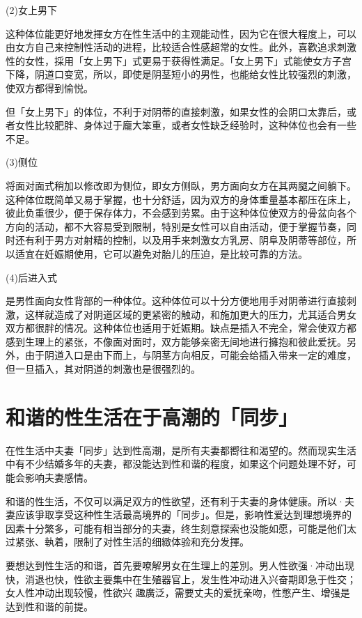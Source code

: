 \documentclass[12pt,UTF8]{ctexbook}
\begin{document}
(2)女上男下

这种体位能更好地发揮女方在性生活中的主观能动性，因为它在很大程度上，可以由女方自己来控制性活动的进程，比较适合性感超常的女性。此外，喜歡追求刺激性的女性，採用「女上男下」式更易于获得性满足。「女上男下」式能使女方子宫下降，阴道口变宽，所以，即使是阴茎短小的男性，也能给女性比较强烈的刺激，使双方都得到愉悦。

但「女上男下」的体位，不利于对阴蒂的直接刺激，如果女性的会阴口太靠后，或者女性比较肥胖、身体过于龐大笨重，或者女性缺乏经验时，这种体位也会有一些不足。

(3)侧位

将面对面式稍加以修改即为侧位，即女方侧臥，男方面向女方在其两腿之间躺下。这种体位既简单又易于掌握，也十分舒适，因为双方的身体重量基本都压在床上，彼此负重很少，便于保存体力，不会感到劳累。由于这种体位使双方的骨盆向各个方向的活动，都不大容易受到限制，特別是女性可以自由活动，便于掌握节奏，同时还有利于男方对射精的控制，以及用手来刺激女方乳房、阴阜及阴蒂等部位，所以适宜在妊娠期使用，它可以避免对胎儿的压迫，是比较可靠的方法。

(4)后进入式

是男性面向女性背部的一种体位。这种体位可以十分方便地用手对阴蒂进行直接刺激，这样就造成了对阴道区域的更紧密的触动，和施加更大的压力，尤其适合男女双方都很胖的情况。这种体位也适用于妊娠期。缺点是插入不完全，常会使双方都感到生理上的紧张，不像面对面时，双方能够亲密无间地进行擁抱和彼此爱抚。另外，由于阴道入口是由下而上，与阴茎方向相反，可能会给插入带来一定的难度，但一旦插入，其对阴道的刺激也是很强烈的。

\section{和谐的性生活在于高潮的「同步」}

在性生活中夫妻「同步」达到性高潮，是所有夫妻都嚮往和渴望的。然而现实生活中有不少结婚多年的夫妻，都没能达到性和谐的程度，如果这个问题处理不好，可能会影响夫妻感情。

和谐的性生活，不仅可以满足双方的性欲望，还有利于夫妻的身体健康。所以·夫妻应该爭取享受这种性生活最高境界的「同步」。但是，影响性爱达到理想境界的因素十分繁多，可能有相当部分的夫妻，终生刻意探索也没能如愿，可能是他们太过紧张、執着，限制了对性生活的细緻体验和充分发揮。

要想达到性生活的和谐，首先要嘹解男女在生理上的差別。男人性欲强·冲动出现快，消退也快，性欲主要集中在生殖器官上，发生性冲动进入兴奋期即急于性交；女人性冲动出现较慢，性欲兴
趣廣泛，需要丈夫的爱抚亲吻，性憋产生、增强是达到性和谐的前提。
\end{document}
